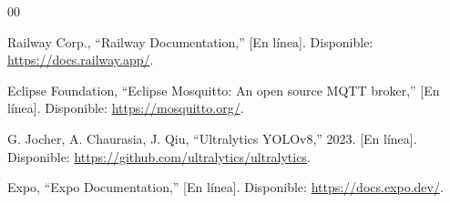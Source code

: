 \begin{thebibliography}{00}

 Railway Corp., ``Railway Documentation,'' [En línea].
Disponible: \url{https://docs.railway.app/}.

 Eclipse Foundation, ``Eclipse Mosquitto: An open
source MQTT broker,'' [En línea]. Disponible:
\url{https://mosquitto.org/}.

 G. Jocher, A. Chaurasia, J. Qiu, ``Ultralytics YOLOv8,''
2023. [En línea]. Disponible: \url{https://github.com/ultralytics/ultralytics}.

 Expo, ``Expo Documentation,'' [En línea]. Disponible:
\url{https://docs.expo.dev/}.

\end{thebibliography}
